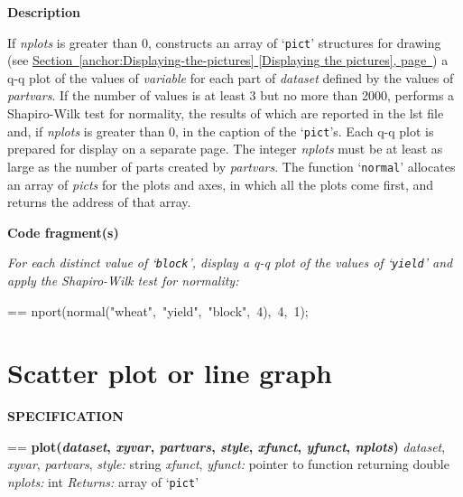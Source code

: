 \documentclass{book}
\makeatletter
\newcommand\Texinfocommandstyletextvar[1]{{\normalfont{}\textsl{#1}}}%
\newenvironment{Texinfopreformatted}{%
  \par\GNUTobeylines\obeyspaces\frenchspacing\parskip=\z@\parindent=\z@}{}
{\catcode`\^^M=13 \gdef\GNUTobeylines{\catcode`\^^M=13 \def^^M{\null\par}}}
\newenvironment{Texinfoindented}{\begin{list}{}{}\item\relax}{\end{list}}
\renewcommand{\_}{\Texinfounderscore\discretionary{}{}{}}
\makeatother
\begin{document}
\noindent{}\textbf{Description}

If \Texinfocommandstyletextvar{nplots} is greater than 0, constructs an array of `\texttt{pict}' structures for
drawing (see \hyperref[anchor:Displaying-the-pictures]{Section~\ref*{anchor:Displaying-the-pictures} [Displaying the pictures], page~\pageref*{anchor:Displaying-the-pictures}})
a q-q plot of the values of \Texinfocommandstyletextvar{variable}
for each part of \Texinfocommandstyletextvar{dataset} defined by the values of \Texinfocommandstyletextvar{partvars}.
If the number of values is at least 3 but no more than 2000, performs a Shapiro-Wilk test
for normality, the results of which are reported in the lst file and, if
\Texinfocommandstyletextvar{nplots} is greater than 0, in the caption of the `\texttt{pict}'s.
Each q-q plot is prepared for display on a separate page.
The integer \Texinfocommandstyletextvar{nplots}
must be at least as large as the number of parts created by \Texinfocommandstyletextvar{partvars}.
The function `\texttt{normal}'
allocates an array of \Texinfocommandstyletextvar{picts} for the plots and axes, in which all
the plots come first, and returns the address of that array.

\noindent{}\textbf{Code fragment(s)}

\emph{For each distinct value of `\texttt{block}', display a q-q plot
of the values of `\texttt{yield}' and apply the
Shapiro-Wilk test for normality:}
\begin{Texinfoindented}
\begin{Texinfopreformatted}%
\ttfamily nport(normal("wheat",\ "yield",\ "block",\ 4),\ 4,\ 1);
\end{Texinfopreformatted}
\end{Texinfoindented}

\section{{Scatter plot or line graph}}
\label{anchor:Scatter-plot-or-line-graph}%

\noindent{}\textbf{SPECIFICATION}
\begin{Texinfoindented}
\begin{Texinfopreformatted}%
\textbf{plot(\Texinfocommandstyletextvar{dataset}, \Texinfocommandstyletextvar{xyvar}, \Texinfocommandstyletextvar{partvars}, \Texinfocommandstyletextvar{style}, \Texinfocommandstyletextvar{xfunct}, \Texinfocommandstyletextvar{yfunct}, \Texinfocommandstyletextvar{nplots})}
\Texinfocommandstyletextvar{dataset}, \Texinfocommandstyletextvar{xyvar}, \Texinfocommandstyletextvar{partvars}, \Texinfocommandstyletextvar{style:} string
\Texinfocommandstyletextvar{xfunct}, \Texinfocommandstyletextvar{yfunct:} pointer to function returning double
\Texinfocommandstyletextvar{nplots:} int
\Texinfocommandstyletextvar{Returns:} array of `\texttt{pict}'
\end{Texinfopreformatted}
\end{Texinfoindented}
\end{document}
